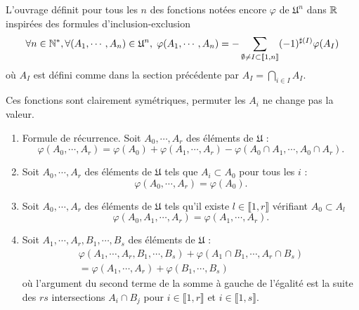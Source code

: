 L'ouvrage définit pour tous les $n$ des fonctions notées encore $\varphi$ de $\mathfrak{U}^n$ dans $\mathbb{R}$ inspirées des formules d'inclusion-exclusion
\begin{displaymath}
  \forall n \in \mathbb{N}^*, \forall (A_1,\cdots, A_n) \in \mathfrak{U}^n, \; 
  \varphi(A_1, \cdots, A_n) = - \sum_{\emptyset \neq I \subset \llbracket 1 , n\rrbracket}(-1)^{\sharp(I)}\varphi(A_I)
\end{displaymath}
où $A_I$ est défini comme dans la section précédente par $A_I = \bigcap_{i\in I} A_I$. 
\begin{rem}
  Ces fonctions sont clairement symétriques, permuter les $A_i$ ne change pas la valeur.
\end{rem}

\begin{prop}
  \begin{enumerate}
    \item Formule de récurrence. Soit $A_0, \cdots, A_r$ des éléments de $\mathfrak{U}$ :
    \begin{displaymath}
      \varphi(A_0,\cdots, A_r) = \varphi(A_0) + \varphi(A_1,\cdots, A_r) - \varphi(A_0\cap A_1, \cdots, A_0\cap A_r). 
    \end{displaymath}
    \item Soit $A_0, \cdots, A_r$ des éléments de $\mathfrak{U}$ tels que $A_i \subset A_0$ pour tous les $i$ :
    \begin{displaymath}
      \varphi(A_0,\cdots, A_r) = \varphi(A_0). 
    \end{displaymath}
    \item Soit $A_0, \cdots, A_r$ des éléments de $\mathfrak{U}$ tels qu'il existe $l \in \llbracket 1, r \rrbracket$ vérifiant $A_0 \subset A_l$ 
    \begin{displaymath}
      \varphi(A_0,A_1, \cdots,A_r) = \varphi(A_1, \cdots,A_r).
    \end{displaymath}
    \item Soit $A_1, \cdots, A_r, B_1, \cdots, B_s$ des éléments de $\mathfrak{U}$ :
    \begin{align*}
      \varphi(A_1, \cdots, A_r, B_1, \cdots, B_s) + \varphi(A_1\cap B_1, \cdots, A_r\cap B_s) \\
      = \varphi(A_1,\cdots,A_r) + \varphi(B_1, \cdots, B_s)
    \end{align*}
où l'argument du second terme de la somme à gauche de l'égalité est la suite des $rs$ intersections $A_i \cap B_j$ pour $i \in \llbracket 1,r \rrbracket$ et $i \in \llbracket 1,s \rrbracket$.
  \end{enumerate}
\end{prop}

